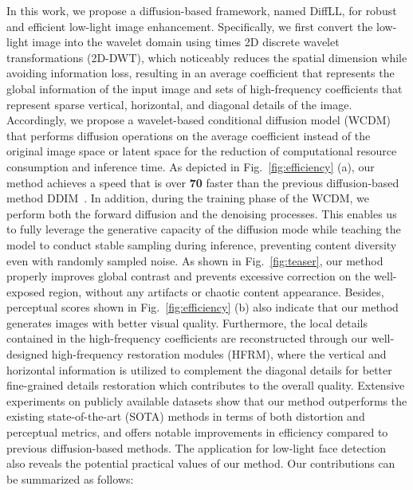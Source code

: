 In this work, we propose a diffusion-based framework, named DiffLL, for robust and efficient low-light image enhancement. Specifically, we first convert the low-light image into the wavelet domain using  times 2D discrete wavelet transformations (2D-DWT), which noticeably reduces the spatial dimension while avoiding information loss, resulting in an average coefficient that represents the global information of the input image and  sets of high-frequency coefficients that represent sparse vertical, horizontal, and diagonal details of the image. Accordingly, we propose a wavelet-based conditional diffusion model (WCDM) that performs diffusion operations on the average coefficient instead of the original image space or latent space for the reduction of computational resource consumption and inference time. As depicted in Fig.~\ref{fig:efficiency} (a), our method achieves a speed that is over \textbf{70} faster than the previous diffusion-based method DDIM~\cite{ddim}. In addition, during the training phase of the WCDM, we perform both the forward diffusion and the denoising processes. This enables us to fully leverage the generative capacity of the diffusion mode while teaching the model to conduct stable sampling during inference, preventing content diversity even with randomly sampled noise. As shown in Fig.~\ref{fig:teaser}, our method properly improves global contrast and prevents excessive correction on the well-exposed region, without any artifacts or chaotic content appearance. Besides, perceptual scores shown in Fig.~\ref{fig:efficiency} (b) also indicate that our method generates images with better visual quality. Furthermore, the local details contained in the high-frequency coefficients are reconstructed through our well-designed high-frequency restoration modules (HFRM), where the vertical and horizontal information is utilized to complement the diagonal details for better fine-grained details restoration which contributes to the overall quality. Extensive experiments on publicly available datasets show that our method outperforms the existing state-of-the-art (SOTA) methods in terms of both distortion and perceptual metrics, and offers notable improvements in efficiency compared to previous diffusion-based methods. The application for low-light face detection also reveals the potential practical values of our method. Our contributions can be summarized as follows:
